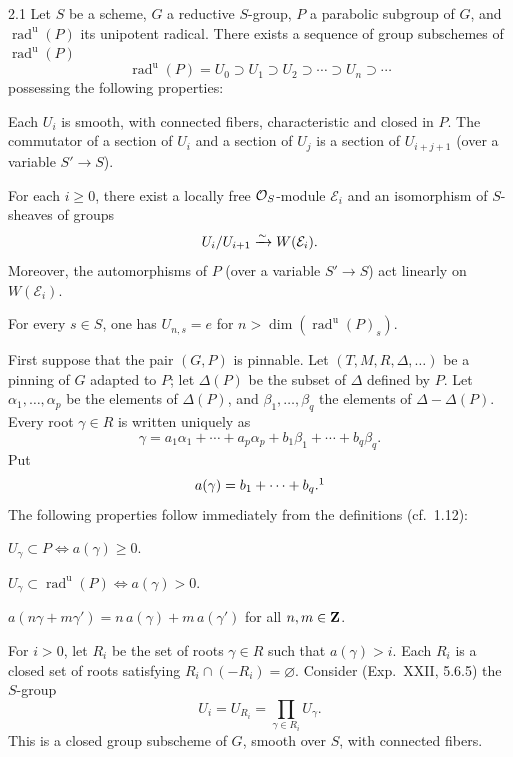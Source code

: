 \begin{proposition}{2.1}\label{XXVI.2.1}
Let $S$ be a scheme, $G$ a reductive $S$-group, $P$ a parabolic subgroup of $G$, and $\operatorname{rad}^{\mathrm u}(P)$ its unipotent radical. There exists a sequence of group subschemes of $\operatorname{rad}^{\mathrm u}(P)$
\[
\operatorname{rad}^{\mathrm u}(P)=U_0\supset U_1\supset U_2\supset\cdots\supset U_n\supset\cdots
\]
possessing the following properties:
\begin{enumeratei}
\item Each $U_i$ is smooth, with connected fibers, characteristic and closed in $P$. The commutator of a section of $U_i$ and a section of $U_j$ is a section of $U_{i+j+1}$ (over a variable $S'\to S$).
\item For each $i\ge0$, there exist a locally free $\mathcal{O}_S$-module $\mathcal E_i$ and an isomorphism of $S$-sheaves of groups
\[
U_i/U_{i+1}\xrightarrow{\sim} W(\mathcal E_i).
\]
Moreover, the automorphisms of $P$ (over a variable $S'\to S$) act linearly on $W(\mathcal E_i)$.
\item For every $s\in S$, one has $U_{n,s}=e$ for $n>\dim(\operatorname{rad}^{\mathrm u}(P)_s)$.
\end{enumeratei}
\end{proposition}
\label{XXVI.2.1.1}
First suppose that the pair $(G,P)$ is pinnable. Let $(T,M,R,\Delta,\ldots)$ be a pinning of $G$ adapted to $P$; let $\Delta(P)$ be the subset of $\Delta$ defined by $P$. Let $\alpha_1,\ldots,\alpha_p$ be the elements of $\Delta(P)$, and $\beta_1,\ldots,\beta_q$ the elements of $\Delta-\Delta(P)$. Every root $\gamma\in R$ is written uniquely as
\[
\gamma=a_1\alpha_1+\cdots+a_p\alpha_p+b_1\beta_1+\cdots+b_q\beta_q.
\]
Put
\[
a(\gamma)=b_1+\cdots+b_q.\nde{$a_1+\cdots+a_p$ has been corrected to $b_1+\cdots+b_q$.}
\]
The following properties follow immediately from the definitions (cf.~1.12):

\begin{enumeratei}
\item $U_\gamma\subset P\Leftrightarrow a(\gamma)\ge0$.
\item $U_\gamma\subset\operatorname{rad}^{\mathrm u}(P)\Leftrightarrow a(\gamma)>0$.
\item $a(n\gamma+m\gamma')=n\,a(\gamma)+m\,a(\gamma')$ for all $n,m\in\mathbf{Z}$.
\end{enumeratei}
For $i>0$, let $R_i$ be the set of roots $\gamma\in R$ such that $a(\gamma)>i$. Each $R_i$ is a closed set of roots satisfying $R_i\cap(-R_i)=\varnothing$. Consider (Exp.~XXII, 5.6.5) the $S$-group
\[
U_i=U_{R_i}=\prod_{\gamma\in R_i}U_\gamma.
\]
This is a closed group subscheme of $G$, smooth over $S$, with connected fibers.

